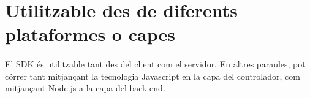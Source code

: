 \section{Utilitzable des de diferents plataformes o capes}

    \paragraph{}
    El SDK és utilitzable tant des del client com el servidor. En altres paraules, pot córrer tant mitjançant la tecnologia Javascript en la capa del controlador, com mitjançant Node.js a la capa del back-end. 
